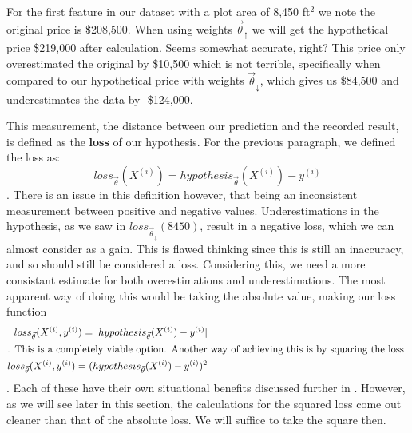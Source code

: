 For the first feature in our dataset with a plot area of 8,450 ft$^2$ we note the original price is \$208,500. When using weights $\vec\theta_{\uparrow}$ we will get the hypothetical price \$219,000 after calculation. Seems somewhat accurate, right? This price only overestimated the original by \$10,500 which is not terrible, specifically when compared to our hypothetical price  with weights $\vec\theta_{\downarrow}$, which gives us \$84,500 and underestimates the data by -\$124,000.

This measurement, the distance between our prediction and the recorded result,
is defined as the \textbf{loss} of our hypothesis. For the previous paragraph, we defined the loss as:
\begin{equation*}
	loss_{\vec\theta}(X^{(i)}) = hypothesis_{\vec\theta}(X^{(i)})-y^{(i)}
\end{equation*}
. There is an issue in this definition however, that being an inconsistent measurement between positive and negative values. Underestimations in the hypothesis, as we saw in $loss_{\vec\theta_{\downarrow}}(8450)$, result in a negative loss, which we can almost consider as a gain. This is flawed thinking since this is still an inaccuracy, and so should still be considered a loss. Considering this, we need a more consistant estimate for both overestimations and underestimations. The most apparent way of doing this would be taking the absolute value, making our loss function
\begin{subequations}
\begin{align}
	loss_{\vec\theta}(X^{(i)}, y^{(i)}) = |hypothesis_{\vec\theta}(X^{(i)}) - y^{(i)}| \\
	\intertext{. This is a completely viable option. Another way of achieving this is by squaring the loss }
	loss_{\vec\theta}(X^{(i)}, y^{(i)}) = (hypothesis_{\vec\theta}(X^{(i)}) - y^{(i)})^2
\end{align}
\end{subequations}
. Each of these have their own situational benefits discussed further in \placeholder. However, as we will see later in this section, the calculations for the squared loss come out cleaner than that of the absolute loss. We will suffice to take the square then.

